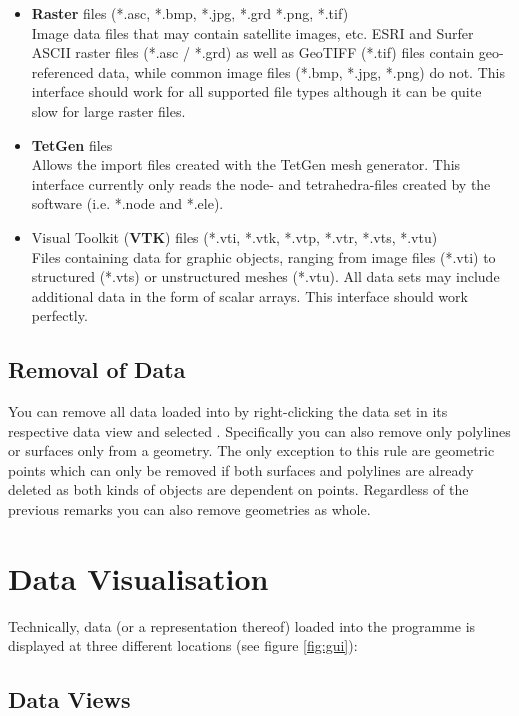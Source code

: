 \begin{itemize}
\item \textbf{Raster} files (*.asc, *.bmp, *.jpg, *.grd *.png, *.tif)\\
Image data files that may contain satellite images, etc. ESRI and Surfer ASCII raster files (*.asc / *.grd) as well as GeoTIFF (*.tif) files contain geo-referenced data, while common image files (*.bmp, *.jpg, *.png) do not. This interface should work for all supported file types although it can be quite slow for large raster files.
\item \textbf{TetGen} files\\
Allows the import files created with the TetGen mesh generator. This interface currently only reads the node- and tetrahedra-files created by the software (i.e. *.node and *.ele).
\item Visual Toolkit (\textbf{VTK}) files (*.vti, *.vtk, *.vtp, *.vtr, *.vts, *.vtu)\\
Files containing data for graphic objects, ranging from image files (*.vti) to structured (*.vts) or unstructured meshes (*.vtu). All data sets may include additional data in the form of scalar arrays. This interface should work perfectly.
\end{itemize}

\subsection{Removal of Data}

You can remove all data loaded into \ogs by right-clicking the data set in its respective data view and selected . Specifically you can also remove only polylines or surfaces only from a geometry. The only exception to this rule are geometric points which can only be removed if both surfaces and polylines are already deleted as both kinds of objects are dependent on points. Regardless of the previous remarks you can also remove geometries as whole.

\section{Data Visualisation}
\label{datavisualisation}

Technically, data (or a representation thereof) loaded into the programme is displayed at three different locations (see figure \ref{fig:gui}):

\subsection{Data Views}

